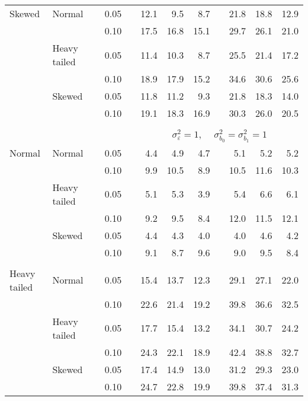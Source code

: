 \begin{table}[ht]
\begin{scriptsize}
\begin{center}
\begin{tabular}{ll p{.1cm} c p{.1cm} rrr p{.1cm} rrr}
Skewed       & Normal       && 0.05 &&   12.1 & 9.5 & 8.7 &   & 21.8 & 18.8 & 12.9 \\ 
             &              && 0.10 &&   17.5 & 16.8 & 15.1 &   & 29.7 & 26.1 & 21.0 \\ 
             & Heavy tailed && 0.05 &&   11.4 & 10.3 & 8.7 &   & 25.5 & 21.4 & 17.2 \\ 
             &              && 0.10 &&   18.9 & 17.9 & 15.2 &   & 34.6 & 30.6 & 25.6 \\ 
             & Skewed       && 0.05 &&   11.8 & 11.2 & 9.3 &   & 21.8 & 18.3 & 14.0 \\ 
             &              && 0.10 &&   19.1 & 18.3 & 16.9 &   & 30.3 & 26.0 & 20.5 \\ 

&&&&&&&&&&&\\
& && && \multicolumn{7}{c}{$\sigma_{\varepsilon}^2 = 1$, \ \ $\sigma_{b_0}^2 = \sigma_{b_1}^2 = 1$} \\ \cline{6-12}
\rowcolor{gray!20}Normal       & Normal       && 0.05 &&   4.4 & 4.9 & 4.7 &   & 5.1 & 5.2 & 5.2 \\ 
\rowcolor{gray!20}             &              && 0.10 &&   9.9 & 10.5 & 8.9 &   & 10.5 & 11.6 & 10.3 \\ 
\rowcolor{gray!20}             & Heavy tailed && 0.05 &&   5.1 & 5.3 & 3.9 &   & 5.4 & 6.6 & 6.1 \\ 
\rowcolor{gray!20}             &              && 0.10 &&   9.2 & 9.5 & 8.4 &   & 12.0 & 11.5 & 12.1 \\ 
\rowcolor{gray!20}             & Skewed       && 0.05 &&   4.4 & 4.3 & 4.0 &   & 4.0 & 4.6 & 4.2 \\ 
\rowcolor{gray!20}             &              && 0.10 &&   9.1 & 8.7 & 9.6 &   & 9.0 & 9.5 & 8.4 \\ 
&&&&&&&&&&&\\
Heavy tailed & Normal       && 0.05 &&   15.4 & 13.7 & 12.3 &   & 29.1 & 27.1 & 22.0 \\ 
             &              && 0.10 &&   22.6 & 21.4 & 19.2 &   & 39.8 & 36.6 & 32.5 \\ 
             & Heavy tailed && 0.05 &&   17.7 & 15.4 & 13.2 &   & 34.1 & 30.7 & 24.2 \\ 
             &              && 0.10 &&   24.3 & 22.1 & 18.9 &   & 42.4 & 38.8 & 32.7 \\ 
             & Skewed       && 0.05 &&   17.4 & 14.9 & 13.0 &   & 31.2 & 29.3 & 23.0 \\ 
             &              && 0.10 &&   24.7 & 22.8 & 19.9 &   & 39.8 & 37.4 & 31.3 \\ 

\end{tabular}
\end{center}
\end{scriptsize}
\end{table}
